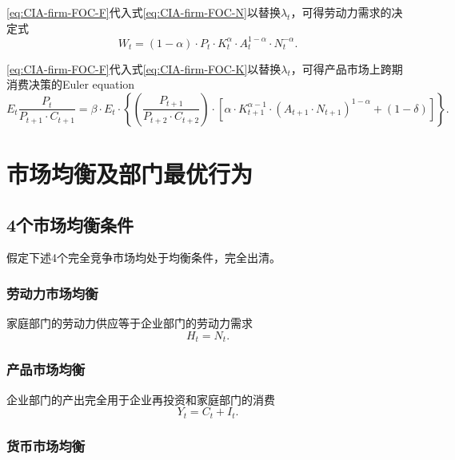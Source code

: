 \eqref{eq:CIA-firm-FOC-F}代入式\eqref{eq:CIA-firm-FOC-N}以替换$\lambda_t$，可得劳动力需求的决定式
\begin{equation}
  \label{eq:CIA-FOC-labor-demand}
  W_t = \left( 1-\alpha \right) \cdot P_t \cdot K_t^{\alpha} \cdot A_{t}^{1- \alpha} \cdot N_t^{-\alpha}.
\end{equation}

 \eqref{eq:CIA-firm-FOC-F}代入式\eqref{eq:CIA-firm-FOC-K}以替换$\lambda_t$，可得产品市场上跨期消费决策的Euler equation
\begin{equation}
  \label{eq:CIA-FOC-goods}
  E_t \frac{P_t}{P_{t+1} \cdot C_{t+1}} = \beta \cdot E_t \cdot
  \left\{
\left( \frac{P_{t+1}}{P_{t+2} \cdot C_{t+2}} \right) \cdot
\left[
  \alpha \cdot K_{t+1}^{\alpha -1 } \cdot
  \left(A_{t+1} \cdot N_{t+1} \right)^{1-\alpha} + (1-\delta)
\right]
  \right\}.
\end{equation}


\section{市场均衡及部门最优行为}

\subsection{4个市场均衡条件}
假定下述4个完全竞争市场均处于均衡条件，完全出清。

\subsubsection{劳动力市场均衡}

家庭部门的劳动力供应等于企业部门的劳动力需求
\begin{equation}
  \label{eq:CIA-market-clearing-labor}
  H_t = N_t.
\end{equation}

\subsubsection{产品市场均衡}

企业部门的产出完全用于企业再投资和家庭部门的消费
\begin{equation}
  \label{eq:CIA-market-clearing-product}
  Y_t = C_t + I_t.
\end{equation}

\subsubsection{货币市场均衡}

